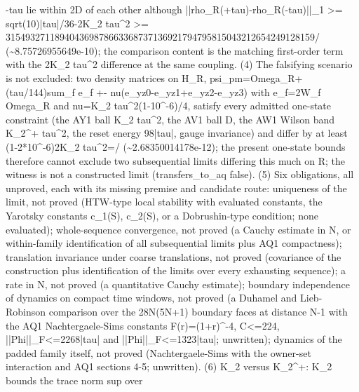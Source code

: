 \begin{gatequote}
-tau lie within 2D of each other although ||rho\_R(+tau)-rho\_R(-tau)||\_1 >=
sqrt(10)|tau|/36-2K\_2\textquotesingle{} tau\textasciicircum{}2 >=
315493271189404369878663368737136921794795815043212654249128159/
(\textasciitilde{}8.75726955649e-10); the comparison content is the matching
first-order term with the 2K\_2\textquotesingle{} tau\textasciicircum{}2
difference at the same coupling. (4) The falsifying scenario is not excluded:
two density matrices on H\_R, psi\_pm=Omega\_R+(tau/144)sum\_f e\_f +-
nu(e\_yz0-e\_yz1+e\_yz2-e\_yz3) with e\_f=2W\_f Omega\_R and
nu=K\_2\textquotesingle{} tau\textasciicircum{}2(1-10\textasciicircum{}-6)/4,
satisfy every admitted one-state constraint (the AY1 ball
K\_2\textquotesingle{} tau\textasciicircum{}2, the AV1 ball D, the AW1 Wilson
band K\_2\textasciicircum{}+ tau\textasciicircum{}2, the reset energy 98|tau|,
gauge invariance) and differ by at least
(1-2*10\textasciicircum{}-6)2K\_2\textquotesingle{}
tau\textasciicircum{}2=/
(\textasciitilde{}2.68350014178e-12); the present one-state bounds therefore
cannot exclude two subsequential limits differing this much on R; the witness
is not a constructed limit (transfers\_to\_aq false). (5) Six obligations, all
unproved, each with its missing premise and candidate route: uniqueness of the
limit, not proved (HTW-type local stability with evaluated constants, the
Yarotsky constants c\_1(S), c\_2(S), or a Dobrushin-type condition; none
evaluated); whole-sequence convergence, not proved (a Cauchy estimate in N, or
within-family identification of all subsequential limits plus AQ1
compactness); translation invariance under coarse translations, not proved
(covariance of the construction plus identification of the limits over every
exhausting sequence); a rate in N, not proved (a quantitative Cauchy
estimate); boundary independence of dynamics on compact time windows, not
proved (a Duhamel and Lieb-Robinson comparison over the 28N(5N+1) boundary
faces at distance N-1 with the AQ1 Nachtergaele-Sims constants
F(r)=(1+r)\textasciicircum{}-4, C<=224, ||Phi||\_F<=2268|tau| and
||Phi\textquotesingle{}||\_F<=1323|tau|; unwritten); dynamics of the padded
family itself, not proved (Nachtergaele-Sims with the owner-set interaction
and AQ1 sections 4-5; unwritten). (6) K\_2\textquotesingle{} versus
K\_2\textasciicircum{}+: K\_2\textquotesingle{} bounds the trace norm sup over

\end{gatequote}
